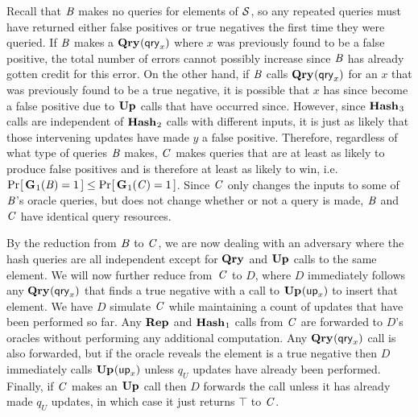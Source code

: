 Recall that $\mathit{B}$ makes no queries for elements of $\mathcal{S}$, so any repeated
queries must have returned either false positives or true negatives the first
time they were queried. If $\mathit{B}$ makes a $\textup{\textbf{Qry}}\hspace{0.5pt}(\mathsf{qry}_x)$ where $x$ was
previously found to be a false positive, the total number of errors cannot
possibly increase since $\mathit{B}$ has already gotten credit for this error. On the
other hand, if $\mathit{B}$ calls $\textup{\textbf{Qry}}\hspace{0.5pt}(\mathsf{qry}_x)$ for an $x$ that was previously
found to be a true negative, it is possible that $x$ has since become a false
positive due to $\textup{\textbf{Up}}\hspace{0.5pt}$ calls that have occurred since. However, since $\textup{\textbf{Hash}}\hspace{0.5pt}_3$
calls are independent of $\textup{\textbf{Hash}}\hspace{0.5pt}_2$ calls with different inputs, it is just as
likely that those intervening updates have made $y$ a false positive. Therefore,
regardless of what type of queries $\mathit{B}$ makes, $\mathit{C}$ makes queries that are
at least as likely to produce false positives and is therefore at least as
likely to win, i.e. $\Pr\hspace{-1pt}\left[\,\textup{\textbf{G}}\hspace{0.5pt}_1(\mathit{B}) = 1\,\right] \le \Pr\hspace{-1pt}\left[\,\textup{\textbf{G}}\hspace{0.5pt}_1(\mathit{C}) = 1\,\right]$.
Since $\mathit{C}$ only changes the inputs to some of $\mathit{B}$'s oracle queries, but
does not change whether or not a query is made, $\mathit{B}$ and $\mathit{C}$ have
identical query resources.

By the reduction from $\mathit{B}$ to $\mathit{C}$, we are now dealing with an adversary
where the hash queries are all independent except for $\textup{\textbf{Qry}}\hspace{0.5pt}$ and $\textup{\textbf{Up}}\hspace{0.5pt}$ calls
to the same element. We will now further reduce from~$\mathit{C}$ to $D$, where $D$
immediately follows any $\textup{\textbf{Qry}}\hspace{0.5pt}(\mathsf{qry}_x)$ that finds a true negative with a
call to $\textup{\textbf{Up}}\hspace{0.5pt}(\mathsf{up}_x)$ to insert that element. We have $D$ simulate $\mathit{C}$ while
maintaining a count of updates that have been performed so far. Any $\textup{\textbf{Rep}}\hspace{0.5pt}$ and
$\textup{\textbf{Hash}}\hspace{0.5pt}_1$ calls from $\mathit{C}$ are forwarded to $D$'s oracles without
performing any additional computation. Any $\textup{\textbf{Qry}}\hspace{0.5pt}(\mathsf{qry}_x)$ call is also
forwarded, but if the oracle reveals the element is a true negative then $D$
immediately calls $\textup{\textbf{Up}}\hspace{0.5pt}(\mathsf{up}_x)$ unless $q_U$ updates have already been
performed. Finally, if $\mathit{C}$ makes an $\textup{\textbf{Up}}\hspace{0.5pt}$ call then $D$ forwards the call
unless it has already made $q_U$ updates, in which case it just returns $\top$
to $\mathit{C}$.

